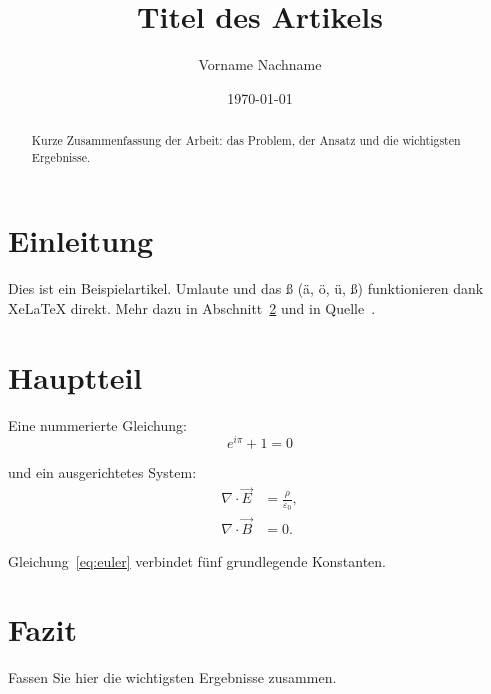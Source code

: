 \documentclass[11pt,a4paper]{article}
\title{Titel des Artikels}
\author{Vorname Nachname}
\date{\today}
\begin{document}
\maketitle

\begin{abstract}
  Kurze Zusammenfassung der Arbeit: das Problem, der Ansatz und die wichtigsten Ergebnisse.
\end{abstract}

\section{Einleitung}
\label{sec:einleitung}

Dies ist ein Beispielartikel. Umlaute und das ß (ä, ö, ü, ß) funktionieren dank
XeLaTeX direkt. Mehr dazu in Abschnitt~\ref{sec:hauptteil} und in
Quelle~\cite{knuth1984}.

\section{Hauptteil}
\label{sec:hauptteil}

Eine nummerierte Gleichung:
\begin{equation}
  \label{eq:euler}
  e^{i\pi} + 1 = 0
\end{equation}

und ein ausgerichtetes System:
\begin{align}
  \nabla \cdot \vec{E} &= \frac{\rho}{\varepsilon_0}, \\
  \nabla \cdot \vec{B} &= 0.
\end{align}

Gleichung~\eqref{eq:euler} verbindet fünf grundlegende Konstanten.

\section{Fazit}

Fassen Sie hier die wichtigsten Ergebnisse zusammen.



\end{document}
